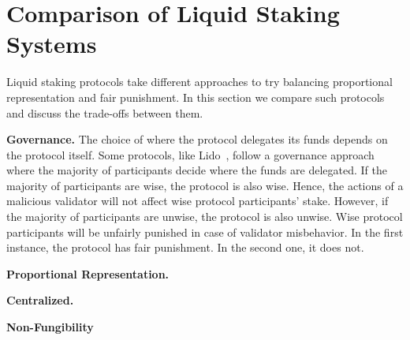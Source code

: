 \section{Comparison of Liquid Staking Systems}

Liquid staking protocols take different approaches to try balancing
proportional representation and fair punishment. In this section we
compare such protocols and discuss the trade-offs between them.

\textbf{Governance.}
The choice of where the protocol delegates its funds depends on the
protocol itself. Some protocols, like Lido~\cite{lido}, follow a governance approach
where the majority of participants decide where the funds are
delegated. If the majority of participants are
wise, the protocol is also wise. Hence, the actions of a malicious validator
will not affect wise protocol participants' stake.
However, if the majority of participants are unwise, the protocol is
also unwise. Wise protocol participants will be unfairly punished in case
of validator misbehavior.
In the first instance, the protocol has fair punishment. In the
second one, it does not.


\textbf{Proportional Representation.}


\textbf{Centralized.}

\textbf{Non-Fungibility}





